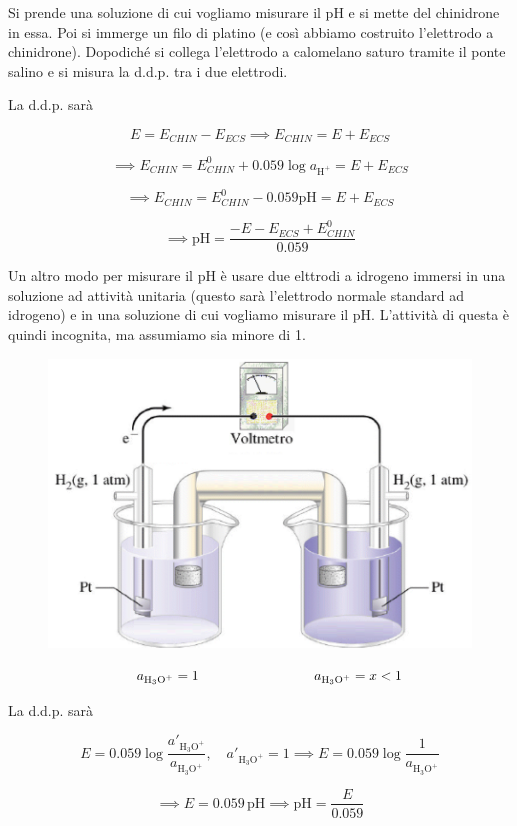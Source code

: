 Si prende una soluzione di cui vogliamo misurare il pH e si mette del chinidrone in essa. Poi si immerge un filo di platino (e così abbiamo costruito l'elettrodo a chinidrone). Dopodiché si collega l'elettrodo a calomelano saturo tramite il ponte salino e si misura la d.d.p. tra i due elettrodi. 

La d.d.p. sarà

$$E= E_{CHIN} - E_{ECS} \implies E_{CHIN}= E + E_{ECS}$$

$$\implies E_{CHIN} = E^{0}_{CHIN} + 0.059 \log a_{\text{H}^+} = E + E_{ECS}$$

$$\implies E_{CHIN} = E^{0}_{CHIN} - 0.059 \text{pH} = E + E_{ECS}$$

$$\implies \text{pH} = \frac{-E - E_{ECS} + E^0_{CHIN}}{0.059}$$

Un altro modo per misurare il pH è usare due elttrodi a idrogeno  immersi in una soluzione ad attività unitaria (questo sarà l'elettrodo normale standard ad idrogeno) e in una soluzione di cui vogliamo misurare il pH. L'attività di questa è quindi incognita, ma assumiamo sia minore di 1.

\begin{figure}[H]
    \centering
    \includegraphics[width=12cm]{immagini/elettrodo_pH.png}
\end{figure}

\vspace{-1cm}$$\hspace{0.5cm}a_{\text{H}_3\text{O}^+}= 1 \hspace{3cm} a_{\text{H}_3\text{O}^+}=x<1$$

La d.d.p. sarà

$$E = 0.059 \log \frac{a'_{\text{H}_3\text{O}^+}}{a_{\text{H}_3\text{O}^+}}, \quad a'_{\text{H}_3\text{O}^+}=1 \implies E = 0.059 \log \frac{1}{a_{\text{H}_3\text{O}^+}}$$

$$ \implies E= 0.059 \, \text{pH} \implies \text{pH} = \frac{E}{0.059}$$



